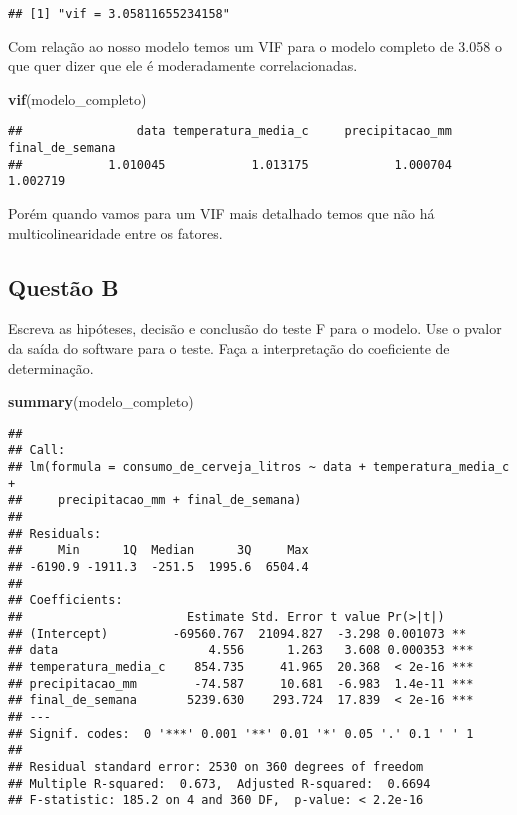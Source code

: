 \documentclass[
]{article}
\newenvironment{Shaded}{\begin{snugshade}}{\end{snugshade}}
\newcommand{\FunctionTok}[1]{\textcolor[rgb]{0.13,0.29,0.53}{\textbf{#1}}}
\newcommand{\NormalTok}[1]{#1}
\begin{document}
\begin{verbatim}
## [1] "vif = 3.05811655234158"
\end{verbatim}

Com relação ao nosso modelo temos um VIF para o modelo completo de 3.058
o que quer dizer que ele é moderadamente correlacionadas.

\begin{Shaded}
\begin{Highlighting}[]
\FunctionTok{vif}\NormalTok{(modelo\_completo)}
\end{Highlighting}
\end{Shaded}

\begin{verbatim}
##                data temperatura_media_c     precipitacao_mm     final_de_semana 
##            1.010045            1.013175            1.000704            1.002719
\end{verbatim}

Porém quando vamos para um VIF mais detalhado temos que não há
multicolinearidade entre os fatores.

\hypertarget{questuxe3o-b}{%
\subsection{Questão B}\label{questuxe3o-b}}

Escreva as hipóteses, decisão e conclusão do teste F para o modelo. Use
o pvalor da saída do software para o teste. Faça a interpretação do
coeficiente de determinação.

\begin{Shaded}
\begin{Highlighting}[]
\FunctionTok{summary}\NormalTok{(modelo\_completo)}
\end{Highlighting}
\end{Shaded}

\begin{verbatim}
## 
## Call:
## lm(formula = consumo_de_cerveja_litros ~ data + temperatura_media_c + 
##     precipitacao_mm + final_de_semana)
## 
## Residuals:
##     Min      1Q  Median      3Q     Max 
## -6190.9 -1911.3  -251.5  1995.6  6504.4 
## 
## Coefficients:
##                       Estimate Std. Error t value Pr(>|t|)    
## (Intercept)         -69560.767  21094.827  -3.298 0.001073 ** 
## data                     4.556      1.263   3.608 0.000353 ***
## temperatura_media_c    854.735     41.965  20.368  < 2e-16 ***
## precipitacao_mm        -74.587     10.681  -6.983  1.4e-11 ***
## final_de_semana       5239.630    293.724  17.839  < 2e-16 ***
## ---
## Signif. codes:  0 '***' 0.001 '**' 0.01 '*' 0.05 '.' 0.1 ' ' 1
## 
## Residual standard error: 2530 on 360 degrees of freedom
## Multiple R-squared:  0.673,  Adjusted R-squared:  0.6694 
## F-statistic: 185.2 on 4 and 360 DF,  p-value: < 2.2e-16
\end{verbatim}
\end{document}
